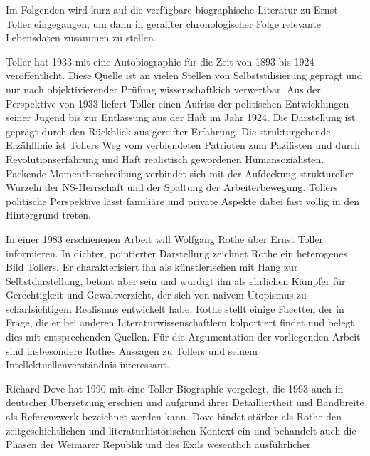 

Im Folgenden wird kurz auf die verfügbare biographische Literatur zu Ernst
Toller eingegangen, um dann in geraffter chronologischer Folge relevante
Lebensdaten zusammen zu stellen.


Toller hat 1933 mit \Cite{Eine Jugend In Deutschland} eine Autobiographie für
die Zeit von 1893 bis 1924 veröffentlicht. Diese Quelle ist an vielen Stellen
von Selbststilisierung geprägt und nur nach objektivierender Prüfung
wissenschaftkich verwertbar.
Aus der Perspektive von 1933 liefert Toller einen Aufriss der politischen
Entwicklungen seiner Jugend bis zur Entlassung aus der Haft im Jahr 1924. Die
Darstellung ist geprägt durch den Rückblick aus gereifter Erfahrung. Die
strukturgebende Erzähllinie ist Tollers Weg vom verblendeten Patrioten zum
Pazifisten und durch Revolutionserfahrung und Haft realistisch gewordenen
Humansozialisten. Packende Momentbeschreibung verbindet sich mit der
Aufdeckung struktureller Wurzeln der NS-Herrschaft und der Spaltung der
Arbeiterbewegung. Tollers politische Perspektive lässt familiäre und private
Aspekte dabei fast völlig in den Hintergrund treten.

In einer 1983 erschienenen Arbeit will Wolfgang Rothe \Cite{in Selbstzeugnissen
und Bilddokumenten} über Ernst Toller informieren. In dichter, pointierter
Darstellung zeichnet Rothe ein heterogenes Bild Tollers. Er charakterisiert
ihn als künstlerischen \Cite{Amateur wenn nicht Dilettant} mit Hang zur
Selbstdarstellung, betont aber sein \Cite{rhetorisches Genie} und würdigt ihn
als ehrlichen Kämpfer für Gerechtigkeit und Gewaltverzicht, der sich von
naivem Utopismus zu scharfsichtigem Realismus entwickelt habe.
Rothe stellt einige Facetten der \Cite{Tollerlegende} in Frage, die er bei
anderen Literaturwissenschaftlern kolportiert findet und belegt dies mit
entsprechenden Quellen. Für die Argumentation der vorliegenden Arbeit sind
insbesondere Rothes Aussagen zu Tollers \Cite{Menschheitsutopien} und seinem
Intellektuellenverständnis interessant.

Richard Dove hat 1990 mit \Cite{He was a German} eine Toller-Biographie
vorgelegt, die 1993 auch in deutscher Übersetzung erschien und aufgrund ihrer
Detailliertheit und Bandbreite als Referenzwerk bezeichnet werden kann. Dove bindet
stärker als Rothe den zeitgeschichtlichen und literaturhistorischen Kontext
ein und behandelt auch die Phasen der Weimarer Republik und des Exils wesentlich
ausführlicher.

